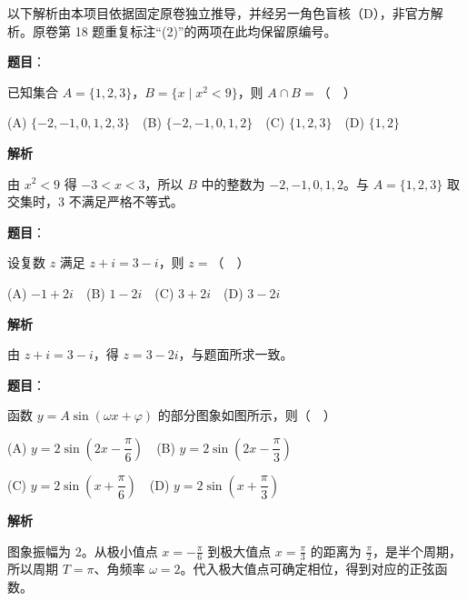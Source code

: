 

\begin{gktip}
以下解析由本项目依据固定原卷独立推导，并经另一角色盲核（D），非官方解析。原卷第 18 题重复标注“(2)”的两项在此均保留原编号。
\end{gktip}


\begin{answer}

\textbf{题目}：

已知集合 $A=\{1,2,3\}$，$B=\{x\mid x^2<9\}$，则 $A\cap B=$（　）

   (A) $\{-2,-1,0,1,2,3\}$　(B) $\{-2,-1,0,1,2\}$　(C) $\{1,2,3\}$　(D) $\{1,2\}$

\textbf{解析}

由 $x^2<9$ 得 $-3<x<3$，所以 $B$ 中的整数为 $-2,-1,0,1,2$。与 $A=\{1,2,3\}$ 取交集时，$3$ 不满足严格不等式。


\end{answer}
\begin{answer}

\textbf{题目}：

设复数 $z$ 满足 $z+i=3-i$，则 $z=$（　）

   (A) $-1+2i$　(B) $1-2i$　(C) $3+2i$　(D) $3-2i$

\textbf{解析}

由 $z+i=3-i$，得 $z=3-2i$，与题面所求一致。


\end{answer}
\begin{answer}

\textbf{题目}：

函数 $y=A\sin(\omega x+\varphi)$ 的部分图象如图所示，则（　）
\nopagebreak[4]
\begin{center}\end{center}
\nopagebreak[4]
   (A) $y=2\sin\left(2x-\dfrac{\pi}{6}\right)$　(B) $y=2\sin\left(2x-\dfrac{\pi}{3}\right)$

   (C) $y=2\sin\left(x+\dfrac{\pi}{6}\right)$　(D) $y=2\sin\left(x+\dfrac{\pi}{3}\right)$

\textbf{解析}

图象振幅为 $2$。从极小值点 $x=-\frac{\pi}{6}$ 到极大值点 $x=\frac{\pi}{3}$ 的距离为 $\frac{\pi}{2}$，是半个周期，所以周期 $T=\pi$、角频率 $\omega=2$。代入极大值点可确定相位，得到对应的正弦函数。


\end{answer}
